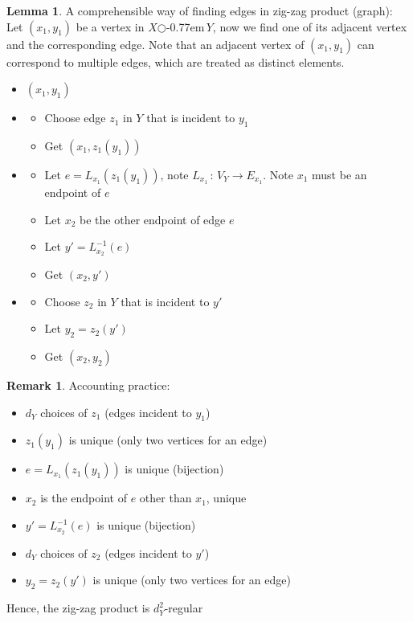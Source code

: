 \documentclass{book}
\newcommand{\zigzag}{$\bigcirc$\kern-0.77em\raisebox{-.16ex}{\small Z}$\,$}
\theoremstyle{definition}
\newtheorem{lemma}{Lemma}[chapter]
\theoremstyle{remarkstyle}
\newtheorem*{remark}{Remark}%
\begin{document}
\begin{lemma}
    A comprehensible way of finding edges in zig-zag product (graph): \newline
    Let $(x_1,y_1)$ be a vertex in $X$\zigzag $Y$, now we find one of its adjacent vertex and the corresponding edge. Note that an adjacent vertex of $(x_1,y_1)$ can correspond to multiple edges, which are treated as distinct elements. \newline
    \begin{itemize}
        \item[Step 0] $(x_1,y_1)$
        \item[Step 1 (Zig)] 
        \begin{itemize}
            \item Choose edge $z_1$ in $Y$ that is incident to $y_1$
            \item Get $(x_1,z_1(y_1))$
        \end{itemize}
        \item[Step 2 (-)]
        \begin{itemize}
            \item Let $e=L_{x_1}(z_1(y_1))$, note $L_{x_1}\,:\, V_Y \rightarrow E_{x_1} $. Note $x_1$ must be an endpoint of $e$
            \item Let $x_2$ be the other endpoint of edge $e$ 
            \item Let $y' = L^{-1}_{x_2}(e) $
            \item Get $(x_2, y') $
        \end{itemize}
        \item[Step 3 (Zag)]
        \begin{itemize}
            \item Choose $z_2$ in $Y$ that is incident to $y'$
            \item Let $y_2=z_2(y')$
            \item Get $(x_2,y_2)$
        \end{itemize}        
    \end{itemize}
\end{lemma}
\begin{remark}
    Accounting practice:
    \begin{itemize}
        \item $d_Y$ choices of $z_1$ (edges incident to $y_1$)
        \item $z_1(y_1)$ is unique (only two vertices for an edge)
        \item $e=L_{x_1}(z_1(y_1))$ is unique (bijection)
        \item $x_2$ is the endpoint of $e$ other than $x_1$, unique
        \item $y' = L^{-1}_{x_2}(e) $ is unique (bijection)
        \item $d_Y$ choices of $z_2$ (edges incident to $y'$)
        \item $y_2=z_2(y')$ is unique (only two vertices for an edge)
    \end{itemize}
    Hence, the zig-zag product is $d_{Y}^{2}$-regular \newline
\end{remark}
\end{document}
